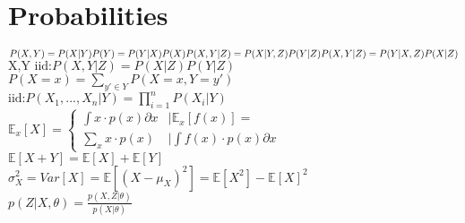\section*{Probabilities}
$P(X,Y)=P(X|Y)P(Y)=P(Y|X)P(X)\\
P(X,Y|Z)=P(X|Y,Z)P(Y|Z)\\
P(X,Y|Z)=P(Y|X,Z)P(X|Z)$\\
$\text{X,Y iid:}P(X,Y|Z)=P(X|Z)P(Y|Z)$\\
$P(X=x)=\sum_{y'\in Y}P(X=x,Y=y')$\\
$\text{iid:}P(X_1,...,X_n|Y)=\prod_{i=1}^{n}P(X_i|Y)$\\
$\mathbb{E}_x[X] = \begin{cases}
   \int x \cdot p(x) \partial x  &|\mathbb{E}_x[f(x)] =\\
   \sum_x x \cdot p(x) &|\int f(x) \cdot p(x) \partial x
  \end{cases}$\\
$\mathbb{E}[X+Y]=\mathbb{E}[X]+\mathbb{E}[Y]$\\
$\sigma_X^2=Var[X] = \mathbb{E}[(X-\mu_X)^2] = \mathbb{E}[X^2] - \mathbb{E}[X]^2$\\
$p(Z|X,\theta) = \frac{p(X,Z|\theta)}{p(X|\theta)}$\\
